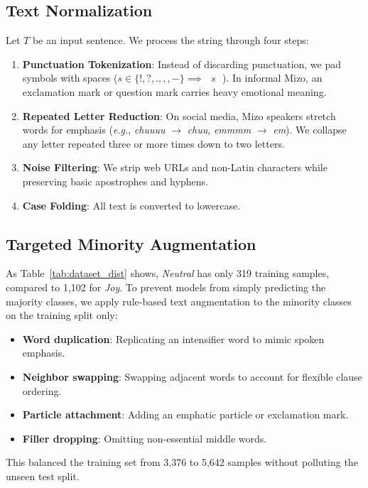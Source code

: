 \documentclass[conference]{IEEEtran}
\begin{document}
\subsection{Text Normalization}
Let $T$ be an input sentence. We process the string through four steps:
\begin{enumerate}
    \item \textbf{Punctuation Tokenization}: Instead of discarding punctuation, we pad symbols with spaces ($s \in \{!, ?, ., ,, -\} \implies \text{ } s \text{ }$). In informal Mizo, an exclamation mark or question mark carries heavy emotional meaning.
    \item \textbf{Repeated Letter Reduction}: On social media, Mizo speakers stretch words for emphasis (\textit{e.g.}, \textit{chuuuu} $\to$ \textit{chuu}, \textit{emmmm} $\to$ \textit{em}). We collapse any letter repeated three or more times down to two letters.
    \item \textbf{Noise Filtering}: We strip web URLs and non-Latin characters while preserving basic apostrophes and hyphens.
    \item \textbf{Case Folding}: All text is converted to lowercase.
\end{enumerate}

\subsection{Targeted Minority Augmentation}
As Table~\ref{tab:dataset_dist} shows, \textit{Neutral} has only 319 training samples, compared to 1,102 for \textit{Joy}. To prevent models from simply predicting the majority classes, we apply rule-based text augmentation to the minority classes on the training split only:
\begin{itemize}
    \item \textbf{Word duplication}: Replicating an intensifier word to mimic spoken emphasis.
    \item \textbf{Neighbor swapping}: Swapping adjacent words to account for flexible clause ordering.
    \item \textbf{Particle attachment}: Adding an emphatic particle or exclamation mark.
    \item \textbf{Filler dropping}: Omitting non-essential middle words.
\end{itemize}
This balanced the training set from 3,376 to 5,642 samples without polluting the unseen test split.
\end{document}
